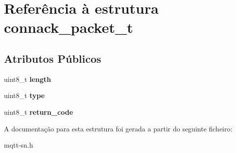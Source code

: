 \hypertarget{structconnack__packet__t}{\section{Referência à estrutura connack\+\_\+packet\+\_\+t}
\label{structconnack__packet__t}
}
\subsection*{Atributos Públicos}
\begin{DoxyCompactItemize}
\item 
\hypertarget{structconnack__packet__t_a392983470536680eeb87165f76ab7296}{uint8\+\_\+t {\bfseries length}}\label{structconnack__packet__t_a392983470536680eeb87165f76ab7296}

\item 
\hypertarget{structconnack__packet__t_a63a96761c52d9ea54c54bef14e35562f}{uint8\+\_\+t {\bfseries type}}\label{structconnack__packet__t_a63a96761c52d9ea54c54bef14e35562f}

\item 
\hypertarget{structconnack__packet__t_ae3c0f8da28cb920a1e382b1192305f15}{uint8\+\_\+t {\bfseries return\+\_\+code}}\label{structconnack__packet__t_ae3c0f8da28cb920a1e382b1192305f15}

\end{DoxyCompactItemize}


A documentação para esta estrutura foi gerada a partir do seguinte ficheiro\+:\begin{DoxyCompactItemize}
\item 
mqtt-\/sn.\+h\end{DoxyCompactItemize}
